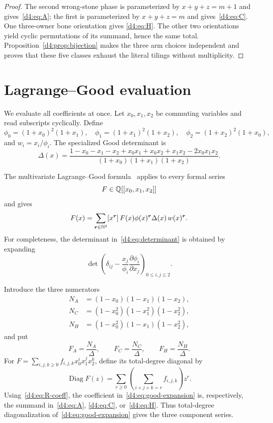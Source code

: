 \begin{proof}
The second wrong-stone phase is parameterized by
$x+y+z=m+1$ and gives~\eqref{d4:eq:A}; the first is parameterized by
$x+y+z=m$ and gives~\eqref{d4:eq:C}.  One three-owner bone orientation gives
\eqref{d4:eq:H}.  The other two orientations yield cyclic permutations of its
summand, hence the same total.  Proposition~\ref{d4:prop:bijection} makes the
three arm choices independent and proves that these five classes exhaust the
literal tilings without multiplicity.
\end{proof}

\section{Lagrange--Good evaluation}

We evaluate all coefficients at once.  Let $x_0,x_1,x_2$ be commuting
variables and read subscripts cyclically.  Define
\begin{equation}\label{d4:eq:phi}
 \phi_0=(1+x_0)^2(1+x_1),\quad
 \phi_1=(1+x_1)^2(1+x_2),\quad
 \phi_2=(1+x_2)^2(1+x_0),
\end{equation}
and $w_i=x_i/\phi_i$.  The specialized Good determinant is
\begin{equation}\label{d4:eq:determinant}
 \Delta(x)=
 \frac{1-x_0-x_1-x_2+x_0x_1+x_0x_2+x_1x_2-2x_0x_1x_2}
 {(1+x_0)(1+x_1)(1+x_2)}.
\end{equation}

The multivariate Lagrange--Good formula~\cite{Good,Hofbauer} applies to every
formal series
\[
 F\in\mathbb Q[[x_0,x_1,x_2]]
\]
and gives
\begin{equation}\label{d4:eq:good-expansion}
 F(x)=\sum_{\boldsymbol r\in\mathbb N^3}
 [x^{\boldsymbol r}]\,
 F(x)\phi(x)^{\boldsymbol r}\Delta(x)\,
 w(x)^{\boldsymbol r}.
\end{equation}
For completeness, the determinant in~\eqref{d4:eq:determinant} is obtained by
expanding
\[
 \det\left(\delta_{ij}-\frac{x_j}{\phi_i}
   \frac{\partial\phi_i}{\partial x_j}\right)_{0\le i,j\le2}.
\]

Introduce the three numerators
\begin{align*}
 N_A&=(1-x_0)(1-x_1)(1-x_2),\\
 N_C&=(1-x_0^2)(1-x_1^2)(1-x_2^2),\\
 N_H&=(1-x_0^2)(1-x_1)(1-x_2^2),
\end{align*}
and put
\[
 F_A=\frac{N_A}{\Delta},\qquad
 F_C=\frac{N_C}{\Delta},\qquad
 F_H=\frac{N_H}{\Delta}.
\]
For $F=\sum_{i,j,k\ge0}f_{i,j,k}x_0^ix_1^jx_2^k$, define its total-degree
diagonal by
\[
 \operatorname{Diag}F(z)=\sum_{r\ge0}
   \left(\sum_{i+j+k=r}f_{i,j,k}\right)z^r.
\]
Using~\eqref{d4:eq:R-coeff}, the coefficient in~\eqref{d4:eq:good-expansion} is,
respectively, the summand in~\eqref{d4:eq:A}, \eqref{d4:eq:C}, or~\eqref{d4:eq:H}.
Thus total-degree diagonalization of~\eqref{d4:eq:good-expansion} gives the three
component series.

